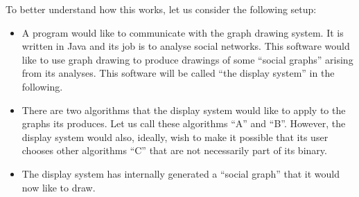 To better understand how this works, let us consider the following setup:
%
\begin{itemize}
    \item A program would like to communicate with the graph drawing system. It
        is written in Java and its job is to analyse social networks. This
        software would like to use graph drawing to produce drawings of some
        ``social graphs'' arising from its analyses. This software will be
        called ``the display system'' in the following.
    \item There are two algorithms that the display system would like to apply
        to the graphs its produces. Let us call these algorithms ``A'' and
        ``B''. However, the display system would also, ideally, wish to make it
        possible that its user chooses other algorithms ``C'' that are not
        necessarily part of its binary.
    \item The display system has internally generated a ``social graph'' that
        it would now like to draw.
\end{itemize}

